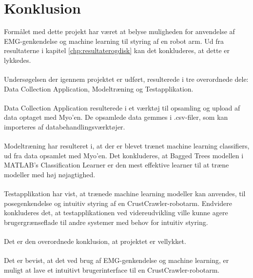 \thispagestyle{fancy}
\chapter{Konklusion}
\label{chp:konklusion}

Formålet med dette projekt har været at belyse muligheden for anvendelse af EMG-genkendelse og machine learning til styring af en robot arm. Ud fra resultaterne i kapitel \ref{chp:resultaterogdisk} kan det konkluderes, at dette er lykkedes.\\\\
Undersøgelsen der igennem projektet er udført, resulterede i tre overordnede dele: Data Collection Application, Modeltræning og Testapplikation.\\\\
Data Collection Application resulterede i et værktøj til opsamling og upload af data optaget med Myo’en. De opsamlede data gemmes i .csv-filer, som kan importeres af databehandlingsværktøjer.\\\\
Modeltræning har resulteret i, at der er blevet trænet machine learning classifiers, ud fra data opsamlet med Myo’en. Det konkluderes, at Bagged Trees modellen i MATLAB’s Classification Learner er den mest effektive learner til at træne modeller med høj nøjagtighed.\\\\
Testapplikation har vist, at trænede machine learning modeller kan anvendes, til posegenkendelse og intuitiv styring af en CrustCrawler-robotarm. Endvidere konkluderes det, at testapplikationen ved videreudvikling ville kunne agere brugergrænseflade til andre systemer med behov for intuitiv styring.\\\\
Det er den overordnede konklusion, at projektet er vellykket.\\\\
Det er bevist, at det ved brug af EMG-genkendelse og machine learning, er muligt at lave et intuitivt brugerinterface til en CrustCrawler-robotarm. 

\label{SidsteSide}